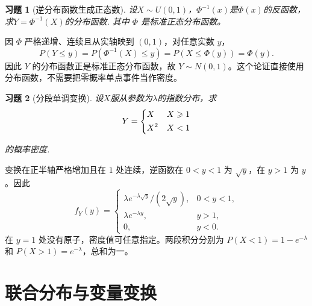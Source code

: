 \documentclass[UTF8,12pt,a4paper,fontset=fandol]{ctexart}
\newtheorem{exercise}{习题}[section]
\begin{document}
\begin{exercise}[逆分布函数生成正态数]\label{q:Y3.29}
设$X \sim  U(0,1)$，$\Phi^{-1}(x)$是$\Phi(x)$的反函数，求$Y=\Phi^{-1} (X)$的分布函数. 其中 $\Phi$ 是标准正态分布函数。\par{}
\end{exercise}

\begin{solve}\label{a:Y3.29}因 $\Phi$ 严格递增、连续且从实轴映到 $(0,1)$，对任意实数 $y$，\[P(Y\le y)=P(\Phi^{-1}(X)\le y)=P(X\le\Phi(y))=\Phi(y).\]因此 $Y$ 的分布函数正是标准正态分布函数，故 $Y\sim N(0,1)$。这个论证直接使用分布函数，不需要把零概率单点事件当作密度。\end{solve}

\begin{exercise}[分段单调变换]\label{q:Y3.31}
设$X$服从参数为$\lambda$的指数分布，求
\[Y = \left\{ \begin{gathered}
  X \hfill \quad X\geqslant 1\\
  {X^2} \hfill \quad  X<1\\ 
\end{gathered}  \right.\]

的概率密度.\par{}
\end{exercise}

\begin{solve}\label{a:Y3.31}变换在正半轴严格增加且在 $1$ 处连续，逆函数在 $0<y<1$ 为 $\sqrt y$，在 $y>1$ 为 $y$。因此\[f_Y(y)=\begin{cases}\lambda e^{-\lambda\sqrt y}/(2\sqrt y),&0<y<1,\\\lambda e^{-\lambda y},&y>1,\\0,&y<0.\end{cases}\]在 $y=1$ 处没有原子，密度值可任意指定。两段积分分别为 $P(X<1)=1-e^{-\lambda}$ 和 $P(X>1)=e^{-\lambda}$，总和为一。\end{solve}

\clearpage\section{联合分布与变量变换}
\end{document}
